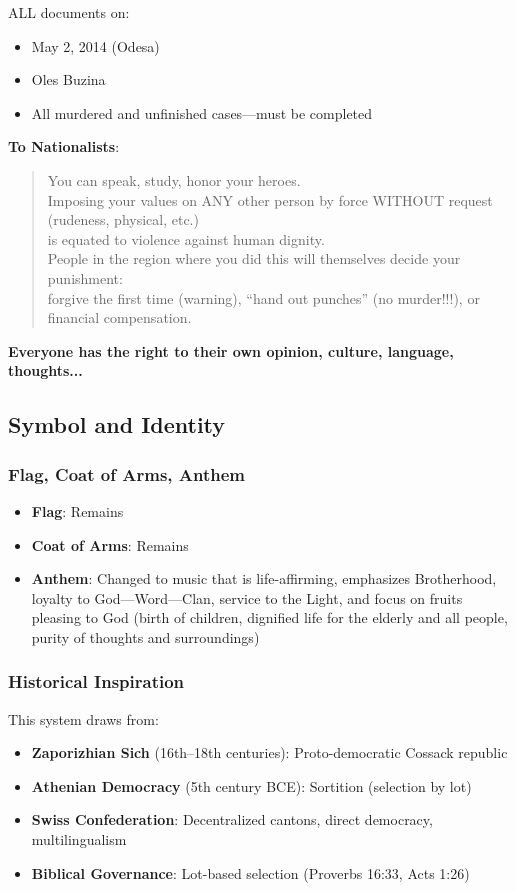 \documentclass[11pt,a4paper]{article}
\theoremstyle{definition}
\theoremstyle{remark}
\begin{document}
ALL documents on:
\begin{itemize}
\item May 2, 2014 (Odesa)
\item Oles Buzina
\item All murdered and unfinished cases—must be completed
\end{itemize}

\textbf{To Nationalists}:
\begin{quote}
You can speak, study, honor your heroes. \\
Imposing your values on ANY other person by force WITHOUT request (rudeness, physical, etc.) \\
is equated to violence against human dignity. \\
People in the region where you did this will themselves decide your punishment: \\
forgive the first time (warning), ``hand out punches'' (no murder!!!), or financial compensation.
\end{quote}

\textbf{Everyone has the right to their own opinion, culture, language, thoughts...}

\subsection{Symbol and Identity}

\subsubsection{Flag, Coat of Arms, Anthem}

\begin{itemize}
\item \textbf{Flag}: Remains
\item \textbf{Coat of Arms}: Remains
\item \textbf{Anthem}: Changed to music that is life-affirming, emphasizes Brotherhood, loyalty to God—Word—Clan, service to the Light, and focus on fruits pleasing to God (birth of children, dignified life for the elderly and all people, purity of thoughts and surroundings)
\end{itemize}

\subsubsection{Historical Inspiration}

This system draws from:
\begin{itemize}
\item \textbf{Zaporizhian Sich} (16th–18th centuries): Proto-democratic Cossack republic
\item \textbf{Athenian Democracy} (5th century BCE): Sortition (selection by lot)
\item \textbf{Swiss Confederation}: Decentralized cantons, direct democracy, multilingualism
\item \textbf{Biblical Governance}: Lot-based selection (Proverbs 16:33, Acts 1:26)
\end{itemize}
\end{document}

